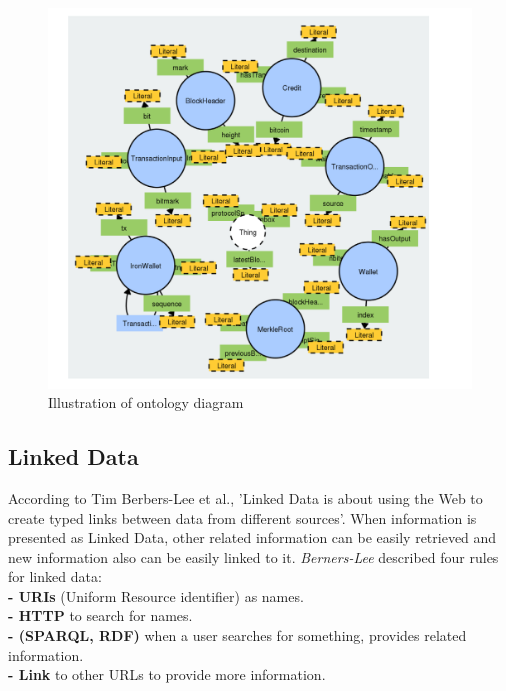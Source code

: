 \begin{center}
	
	
	\begin{figure}[htb!]
		
		\begin{minipage}{0.55\linewidth}
			\centering
			\includegraphics[width=1.65\textwidth]{images/chap02_diagram_ontology.png}
		\end{minipage}
		\caption[Illustration of ontology diagram]{Illustration of ontology diagram\cite{Matthew}}
		
		
	\end{figure}
	
\end{center}

\subsection{Linked Data}
According to Tim Berbers-Lee et al.\cite{Tim}, 'Linked Data is about using the Web to create typed links between data
from different sources'. When information
is presented as Linked Data, other related information can be easily retrieved and new information also can be easily linked to it. \textit{Berners-Lee} described four rules for linked data:\\
\textbf{- URIs} (Uniform Resource identifier) as names.\\ 
\textbf{- HTTP} to search for names.\\
\textbf{- (SPARQL, RDF)}  when a user searches for something, provides related information.\\
\textbf{- Link} to other URLs to provide more information\cite{Hector}.\\

